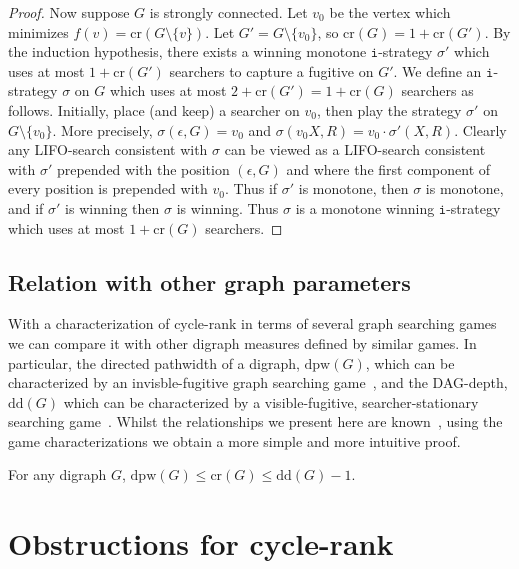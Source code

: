 \documentclass{llncs}
\newcommand{\cycr}[1]{\textrm{cr}(#1)}
\newcommand{\ivar}{\texttt{i}}
\begin{document}
\begin{proof}
Now suppose $G$ is strongly connected.  Let $v_0$ be the vertex which minimizes $f(v) = \cycr{G \setminus \{v\}}$.  Let $G' = G \setminus \{v_0\}$, so $\cycr{G} = 1 + \cycr{G'}$. By the induction hypothesis, there exists a winning monotone $\ivar$-strategy $\sigma'$ which uses at most $1+\cycr{G'}$ searchers to capture a fugitive on $G'$.  We define an $\ivar$-strategy $\sigma$ on $G$ which uses at most $2+\cycr{G'} = 1+\cycr{G}$ searchers as follows.  Initially, place (and keep) a searcher on $v_0$, then play the strategy $\sigma'$ on $G \setminus \{v_0\}$.  More precisely, $\sigma(\epsilon, G) = v_0$ and $\sigma(v_0X,R) = v_0\cdot \sigma'(X,R)$.  Clearly any LIFO-search consistent with $\sigma$ can be viewed as a LIFO-search consistent with $\sigma'$ prepended with the position $(\epsilon, G)$ and where the first component of every position is prepended with $v_0$.  Thus if $\sigma'$ is monotone, then $\sigma$ is monotone, and if $\sigma'$ is winning then $\sigma$ is winning.  Thus $\sigma$ is a monotone winning $\ivar$-strategy which uses at most $1+ \cycr{G}$ searchers.
\end{proof}


\subsection{Relation with other graph parameters}
With a characterization of cycle-rank in terms of several graph searching games we can compare it with other digraph measures defined by similar games.  
In particular, the directed pathwidth of a digraph, $\textrm{dpw}(G)$, which can be characterized by an invisble-fugitive graph searching game~\cite{Bar05}, and the DAG-depth, $\textrm{dd}(G)$ which can be characterized by a visible-fugitive, searcher-stationary searching game~\cite{GHKLOR09}.
Whilst the relationships we present here are known~\cite{Gru08,GHKLOR09}, using the game characterizations we obtain a more simple and more intuitive proof.  
\begin{corollary}
For any digraph $G$, 
\( \textrm{dpw}(G) \leq \cycr{G} \leq \textrm{dd}(G)-1.\)
\end{corollary}


\section{Obstructions for cycle-rank}\label{sec:min-max}
\end{document}
